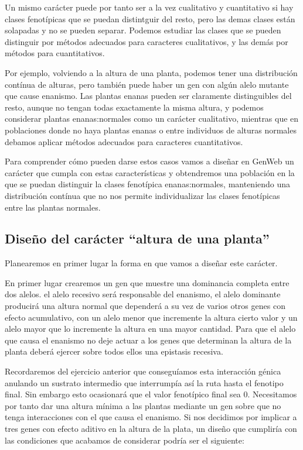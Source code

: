 \documentclass[a4paper]{article}
\begin{document}
Un mismo carácter puede por tanto ser a la vez cualitativo y cuantitativo si hay clases fenotípicas que se puedan distintguir del resto, pero las demas clases están solapadas y no se pueden separar. Podemos estudiar las clases que se pueden distinguir por métodos adecuados para caracteres cualitativos, y las demás por métodos para cuantitativos.

Por ejemplo, volviendo a la altura de una planta, podemos tener una distribución contínua de alturas, pero también puede haber un gen con algún alelo mutante que cause enanismo. Las plantas enanas pueden ser claramente distinguibles del resto, aunque no tengan todas exactamente la misma altura, y podemos considerar plantas enanas:normales como un carácter cualitativo, mientras que en poblaciones donde no haya plantas enanas o entre individuos de alturas normales debamos aplicar métodos adecuados para caracteres cuantitativos.

Para comprender cómo pueden darse estos casos vamos a diseñar en GenWeb un carácter que cumpla con estas características y obtendremos una población en la que se puedan distinguir la clases fenotípica enanas:normales, manteniendo una distribución contínua que no nos permite individualizar las clases fenotípicas entre las plantas normales.

\subsection{Diseño del carácter ``altura de una planta''}

Planearemos en primer lugar la forma en que vamos a diseñar este carácter.

En primer lugar crearemos un gen que muestre una dominancia completa entre dos alelos. el alelo recesivo será responsable del enanismo, el alelo dominante producirá una altura normal que dependerá a su vez de varios otros genes con efecto acumulativo, con un alelo menor que incremente la altura cierto valor y un alelo mayor que lo incremente la altura en una mayor cantidad. Para que el alelo que causa el enanismo no deje actuar a los genes que determinan la altura de la planta deberá ejercer sobre todos ellos una epistasis recesiva.

Recordaremos del ejercicio anterior que conseguíamos esta interacción génica anulando un sustrato intermedio que interrumpía así la ruta hasta el fenotipo final. Sin embargo esto ocasionará que el valor fenotípico final sea 0. Necesitamos por tanto dar una altura mínima a las plantas mediante un gen sobre que no tenga interacciones con el que causa el enanismo. Si nos decidimos por implicar a tres genes con efecto aditivo en la altura de la plata, un diseño que cumpliría con las condiciones que acabamos de considerar podría ser el siguiente:
\end{document}

